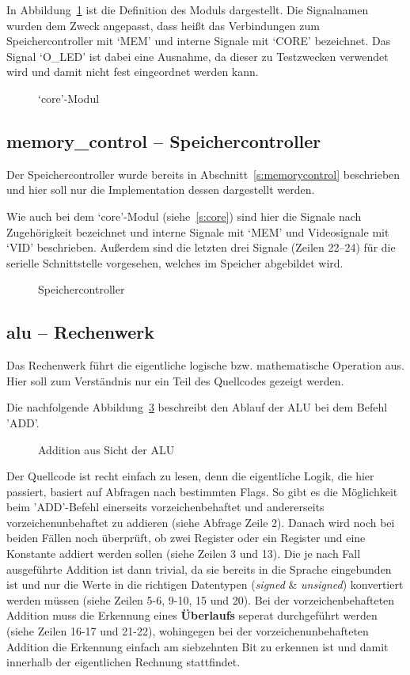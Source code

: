 In Abbildung~\ref{code:core} ist die Definition des Moduls dargestellt. Die
Signalnamen wurden dem Zweck angepasst, dass heißt das Verbindungen zum
Speichercontroller mit `MEM' und interne Signale mit `CORE' bezeichnet. Das
Signal `O\_LED' ist dabei eine Ausnahme, da dieser zu Testzwecken verwendet wird
und damit nicht fest eingeordnet werden kann.
\begin{figure}[htb]

\caption{`core'-Modul}
\label{code:core}
\end{figure}
\pagebreak
\subsection{memory\_control -- Speichercontroller}
\label{s:memcontrol}
Der Speichercontroller wurde bereits in Abschnitt~\ref{s:memorycontrol}
beschrieben und hier soll nur die Implementation dessen dargestellt werden.

Wie auch bei dem `core'-Modul (siehe~\ref{s:core}) sind hier die Signale nach
Zugehörigkeit bezeichnet und interne Signale mit `MEM' und Videosignale mit
`VID' beschrieben. Außerdem sind die letzten drei Signale (Zeilen 22--24) für
die serielle Schnittstelle vorgesehen, welches im Speicher abgebildet wird.
\begin{figure}[htb]

\caption{Speichercontroller}
\label{code:mem_control}
\end{figure}
\pagebreak
\subsection{alu -- Rechenwerk}
Das Rechenwerk führt die eigentliche logische bzw. mathematische Operation aus.
Hier soll zum Verständnis nur ein Teil des Quellcodes gezeigt werden.

Die nachfolgende Abbildung~\ref{code:alu_add} beschreibt den Ablauf der \ac{ALU} bei dem Befehl
'ADD'.

\begin{figure}[htb]

\caption{Addition aus Sicht der ALU}
\label{code:alu_add}
\end{figure}
Der Quellcode ist recht einfach zu lesen, denn die eigentliche Logik, die hier
passiert, basiert auf Abfragen nach bestimmten Flags. So gibt es die Möglichkeit
beim 'ADD'-Befehl einerseits vorzeichenbehaftet und andererseits
vorzeichenunbehaftet zu addieren (siehe Abfrage Zeile 2). Danach wird noch bei
beiden Fällen noch überprüft, ob zwei Register oder ein Register und eine
Konstante addiert werden sollen (siehe Zeilen 3 und 13). Die je nach Fall
ausgeführte Addition ist dann trivial, da sie bereits in die Sprache eingebunden
ist und nur die Werte in die richtigen Datentypen (\textit{signed} \&
\textit{unsigned}) konvertiert werden müssen (siehe Zeilen 5-6, 9-10, 15 und
20).  Bei der vorzeichenbehafteten Addition muss die Erkennung eines
\textbf{Überlaufs} seperat durchgeführt werden (siehe Zeilen 16-17 und 21-22),
wohingegen bei der vorzeichenunbehafteten Addition die Erkennung einfach am
siebzehnten Bit zu erkennen ist und damit innerhalb der eigentlichen Rechnung
stattfindet.
